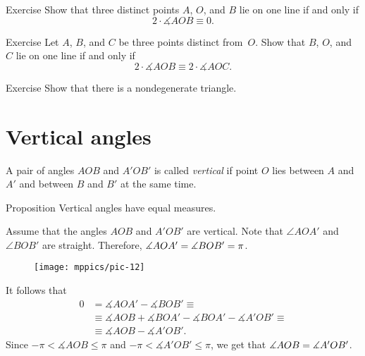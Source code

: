 \begin{thm}{Exercise}\label{ex:lineAOB}
Show that three distinct points $A$, $O$, and $B$ lie on one line if and only if 
$$2\cdot \measuredangle AOB\equiv 0.$$ 

\end{thm}

\begin{thm}{Exercise}\label{ex:ABCO-line}
Let $A$, $B$, and $C$ be three points distinct from~$O$.
Show that $B$, $O$, and $C$ lie on one line if and only if
$$2\cdot \measuredangle AOB\equiv 2\cdot \measuredangle AOC.$$ 

\end{thm}

\begin{thm}{Exercise}\label{ex:infinite-number-of-lines} 
Show that there is a nondegenerate triangle.
\end{thm}

\section{Vertical angles}

A pair of angles $AOB$ and $A'OB'$ 
is called \emph{vertical}
if point $O$ 
lies between $A$ and $A'$ 
and between $B$ and $B'$ at the same time.


\begin{thm}[\abs]{Proposition}\label{prop:vert}
Vertical angles have equal measures.
\end{thm}


Assume that the angles $AOB$ and $A'OB'$ are vertical.
Note that $\angle AOA'$ and $\angle BOB'$ are straight.
Therefore, $\measuredangle AOA'=\measuredangle BOB'=\pi$.

{

\begin{wrapfigure}[4]{o}{24mm}
\vskip-2mm
\centering
\texttt{[image: mppics/pic-12]}
\end{wrapfigure}

It follows that
\begin{align*}
0&=\measuredangle AOA'-\measuredangle BOB'\equiv
\\
&\equiv 
\measuredangle AOB+\measuredangle BOA'-\measuredangle BOA'-\measuredangle A'OB'
\equiv
\\
&\equiv\measuredangle AOB-\measuredangle A'OB'.
\end{align*}
Since $-\pi<\measuredangle AOB\le \pi$ and $-\pi<\measuredangle A'OB'\le \pi$, we get that $\measuredangle AOB=\measuredangle A'OB'$.
\qeds

}


